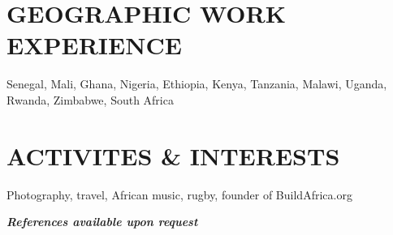 \documentclass{res}
\begin{document}
\begin{resume}
\section{GEOGRAPHIC WORK EXPERIENCE} 
\vspace{8pt}
Senegal, Mali, Ghana, Nigeria, Ethiopia, Kenya, Tanzania, Malawi, Uganda, Rwanda, Zimbabwe, South Africa

\section{ACTIVITES \& INTERESTS} 
\vspace{8pt}
Photography, travel, African music, rugby, founder of BuildAfrica.org

\vspace{20pt}
\centerline{\emph{\textbf{References available upon request}}}

\end{resume} 
\end{document}
